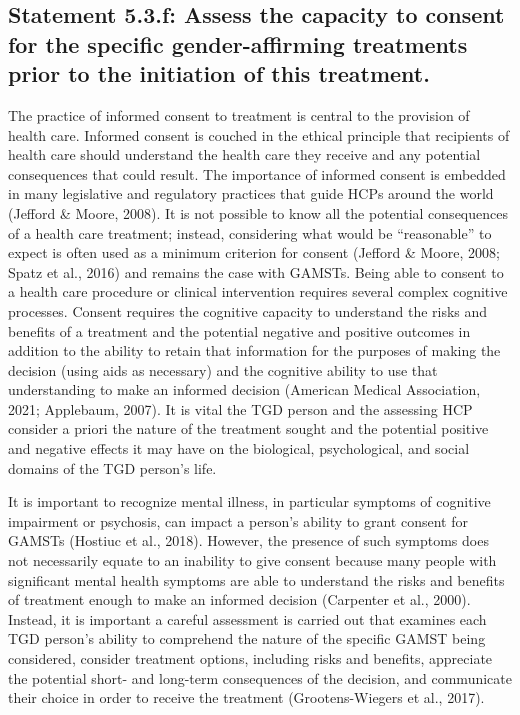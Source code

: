 \documentclass[
]{book}
\begin{document}
\hypertarget{statement-5.3.f-assess-the-capacity-to-consent-for-the-specific-gender-affirming-treatments-prior-to-the-initiation-of-this-treatment.}{%
\subsection*{Statement 5.3.f: Assess the capacity to consent for the specific gender-affirming treatments prior to the initiation of this treatment.}\label{statement-5.3.f-assess-the-capacity-to-consent-for-the-specific-gender-affirming-treatments-prior-to-the-initiation-of-this-treatment.}}

The practice of informed consent to treatment
is central to the provision of health care. Informed
consent is couched in the ethical principle that
recipients of health care should understand the
health care they receive and any potential consequences that could result. The importance of
informed consent is embedded in many legislative
and regulatory practices that guide HCPs around
the world (Jefford \& Moore, 2008). It is not possible to know all the potential consequences of
a health care treatment; instead, considering what
would be ``reasonable'' to expect is often used as
a minimum criterion for consent (Jefford \&
Moore, 2008; Spatz et al., 2016) and remains the
case with GAMSTs. Being able to consent to a
health care procedure or clinical intervention
requires several complex cognitive processes.
Consent requires the cognitive capacity to understand the risks and benefits of a treatment and
the potential negative and positive outcomes in
addition to the ability to retain that information
for the purposes of making the decision (using
aids as necessary) and the cognitive ability to use
that understanding to make an informed decision
(American Medical Association, 2021; Applebaum,
2007). It is vital the TGD person and the assessing HCP consider a priori the nature of the treatment sought and the potential positive and
negative effects it may have on the biological,
psychological, and social domains of the TGD
person's life.

It is important to recognize mental illness, in
particular symptoms of cognitive impairment or
psychosis, can impact a person's ability to grant
consent for GAMSTs (Hostiuc et al., 2018).
However, the presence of such symptoms does
not necessarily equate to an inability to give consent because many people with significant mental
health symptoms are able to understand the risks
and benefits of treatment enough to make an
informed decision (Carpenter et al., 2000).
Instead, it is important a careful assessment is
carried out that examines each TGD person's
ability to comprehend the nature of the specific
GAMST being considered, consider treatment
options, including risks and benefits, appreciate
the potential short- and long-term consequences
of the decision, and communicate their choice in
order to receive the treatment (Grootens-Wiegers
et al., 2017).
\end{document}
